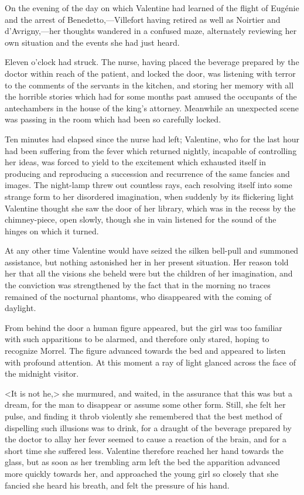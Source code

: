  On the evening of the day on which Valentine had learned of the flight of Eugénie and the arrest of Benedetto,—Villefort having retired as well as Noirtier and d'Avrigny,—her thoughts wandered in a confused maze, alternately reviewing her own situation and the events she had just heard. 

 Eleven o'clock had struck. The nurse, having placed the beverage prepared by the doctor within reach of the patient, and locked the door, was listening with terror to the comments of the servants in the kitchen, and storing her memory with all the horrible stories which had for some months past amused the occupants of the antechambers in the house of the king's attorney. Meanwhile an unexpected scene was passing in the room which had been so carefully locked. 

 Ten minutes had elapsed since the nurse had left; Valentine, who for the last hour had been suffering from the fever which returned nightly, incapable of controlling her ideas, was forced to yield to the excitement which exhausted itself in producing and reproducing a succession and recurrence of the same fancies and images. The night-lamp threw out countless rays, each resolving itself into some strange form to her disordered imagination, when suddenly by its flickering light Valentine thought she saw the door of her library, which was in the recess by the chimney-piece, open slowly, though she in vain listened for the sound of the hinges on which it turned. 

 At any other time Valentine would have seized the silken bell-pull and summoned assistance, but nothing astonished her in her present situation. Her reason told her that all the visions she beheld were but the children of her imagination, and the conviction was strengthened by the fact that in the morning no traces remained of the nocturnal phantoms, who disappeared with the coming of daylight. 

 From behind the door a human figure appeared, but the girl was too familiar with such apparitions to be alarmed, and therefore only stared, hoping to recognize Morrel. The figure advanced towards the bed and appeared to listen with profound attention. At this moment a ray of light glanced across the face of the midnight visitor. 

 <It is not he,> she murmured, and waited, in the assurance that this was but a dream, for the man to disappear or assume some other form. Still, she felt her pulse, and finding it throb violently she remembered that the best method of dispelling such illusions was to drink, for a draught of the beverage prepared by the doctor to allay her fever seemed to cause a reaction of the brain, and for a short time she suffered less. Valentine therefore reached her hand towards the glass, but as soon as her trembling arm left the bed the apparition advanced more quickly towards her, and approached the young girl so closely that she fancied she heard his breath, and felt the pressure of his hand. 

